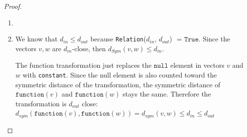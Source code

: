\documentclass[11pt,a4paper]{article}
\begin{document}
\begin{proof}
\begin{enumerate}
    \item 
    \item %

    
    We know that $d_{in} \leq d_{out}$ because \texttt{Relation}($d_{in}$, $d_{out}$) $\texttt{ = True}$. Since the vectors $v, w$ are $d_{in}$-close, then $d_{Sym}(v, w) \leq d_{in}$.
    
    The function transformation just replaces the $\texttt{null}$ element in vectors $v$ and $w$ with \texttt{constant}. Since the null element is also counted toward the symmetric distance of the transformation, the symmetric distance of $\texttt{function}(v)$ and $\texttt{function}(w)$ stays the same. Therefore the transformation is $d_{out}$ close: $d_{sym}(\texttt{function}(v), \texttt{function}(w)) = d_{sym}(v, w) \leq d_{in} \leq d_{out}$
\end{enumerate}

\end{proof}
\end{document}
